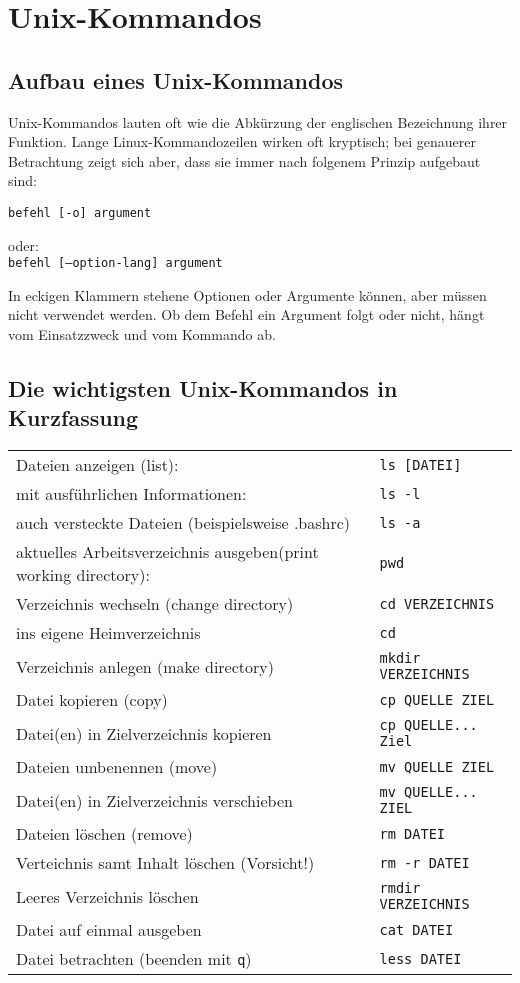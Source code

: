 \documentclass[11pt]{article}
\begin{document}
\section{Unix-Kommandos}
\subsection{Aufbau eines Unix-Kommandos}
Unix-Kommandos lauten oft wie die Abkürzung der englischen Bezeichnung
ihrer Funktion.  Lange Linux-Kommandozeilen wirken oft kryptisch; bei
genauerer Betrachtung zeigt sich aber, dass sie immer nach folgenem
Prinzip aufgebaut sind:

\texttt{befehl [-o] argument} 

oder:\\
\texttt{befehl [--option-lang] argument}

In eckigen Klammern stehene Optionen  oder Argumente können, aber müssen
nicht verwendet werden. Ob dem Befehl ein Argument folgt oder nicht,
hängt vom Einsatzzweck und vom Kommando ab. 

\subsection{Die wichtigsten Unix-Kommandos in Kurzfassung}
\begin{tabular}{|l|l|}
\hline
Dateien anzeigen (list): & \texttt{ls [DATEI]} \\
mit ausführlichen Informationen: & \texttt{ls -l} \\
auch versteckte Dateien (beispielsweise .bashrc) & \texttt{ls -a} \\
\hline
aktuelles Arbeitsverzeichnis ausgeben(print working directory): & \texttt{pwd} \\
\hline 
Verzeichnis wechseln (change directory) & \texttt{cd VERZEICHNIS} \\ 
ins eigene Heimverzeichnis & \texttt{cd} \\
\hline 
Verzeichnis anlegen (make directory) & \texttt{mkdir VERZEICHNIS} \\
\hline
Datei kopieren (copy) & \texttt{cp QUELLE ZIEL} \\  
Datei(en) in Zielverzeichnis kopieren & \texttt{cp QUELLE... Ziel} \\
\hline
Dateien umbenennen (move) & \texttt{mv QUELLE ZIEL} \\  
Datei(en) in Zielverzeichnis verschieben & \texttt{mv QUELLE... ZIEL} \\ 
\hline
Dateien löschen (remove) & \texttt{rm DATEI} \\
Verteichnis samt Inhalt löschen (Vorsicht!) & \texttt{rm -r DATEI} \\
\hline
Leeres Verzeichnis löschen & \texttt{rmdir VERZEICHNIS} \\
\hline  
Datei auf einmal ausgeben & \texttt{cat DATEI} \\
Datei betrachten (beenden mit \texttt{q}) & \texttt{less DATEI}  \\
\hline
\end{tabular} 
\end{document}
